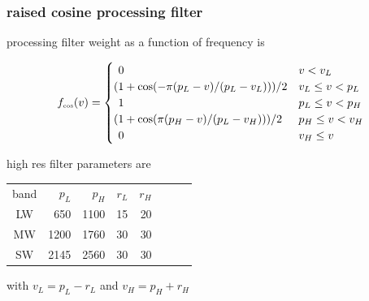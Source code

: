 \documentclass[11pt]{beamer}
\begin{document}
\begin{frame}
\frametitle{raised cosine processing filter}

{\ccast} processing filter weight as a function of frequency is

\[
  f_{\mbox{\tiny cos}}(v) = 
    \begin{cases}
      \hspace{4pt} 0                               &  v < v_L \\
      (1 + \cos(-\pi (p_L - v) / (p_L - v_L))) / 2  &  v_L \leq v < p_L \\
      \hspace{4pt} 1                               &  p_L \leq v < p_H \\
      (1 + \cos( \pi (p_H - v) / (p_L - v_H))) / 2  &  p_H \leq v < v_H \\
      \hspace{4pt} 0                               &  v_H \leq v
    \end{cases}
\]

{\ccast} high res filter parameters are

\vspace{3mm}
\begin{tabular}{crrrrrrr}
band &  $p_L$ &  $p_H$ &  $r_L$ & $r_H$ \\
LW   &   650  &  1100  &   15  &  20  \\
MW   &  1200  &  1760  &   30  &  30  \\
SW   &  2145  &  2560  &   30  &  30
\end{tabular}

\vspace{4mm}

with $v_L = p_L - r_L$ and $v_H = p_H + r_H$

\end{frame}
\end{document}
